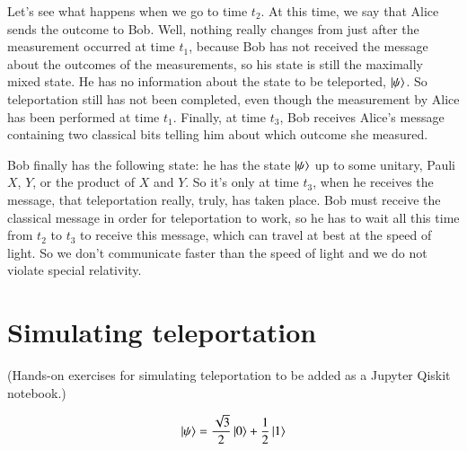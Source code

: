 Let's see what happens when we go to time $t_2$. At this time, we say that Alice sends the outcome to Bob. Well, nothing really changes from just after the measurement occurred at time $t_1$, because Bob has not received the message about the outcomes of the measurements, so his state is still the maximally mixed state. He has no information about the state to be teleported, $\left| \psi \right\rangle$. So teleportation still has not been completed, even though the measurement by Alice has been performed at time $t_1$. Finally, at time $t_3$, Bob receives Alice's message containing two classical bits telling him about which outcome she measured.

Bob finally has the following state: he has the state $\left| \psi \right\rangle$ up to some unitary, Pauli $X$, $Y$, or the product of $X$ and $Y$. So it's only at time $t_3$, when he receives the message, that teleportation really, truly, has taken place. Bob must receive the classical message in order for teleportation to work, so he has to wait all this time from $t_2$ to $t_3$ to receive this message, which can travel at best at the speed of light. So we don't communicate faster than the speed of light and we do not violate special relativity.


\section{Simulating teleportation}
\label{sec:8-4_simulating}

(Hands-on exercises for simulating teleportation to be added as a Jupyter Qiskit notebook.)


\newpage
\begin{exercises}
\begin{equation*}
\left| \psi \right\rangle = \frac{\sqrt{3}}{2}\left| 0 \right\rangle + \frac{1}{2}\left| 1 \right\rangle
\end{equation*}


\end{exercises}

